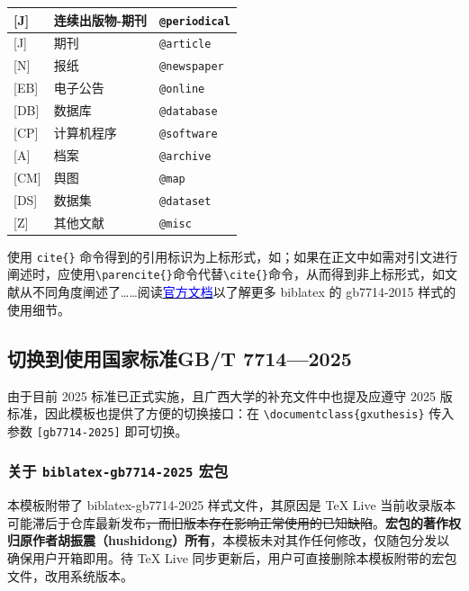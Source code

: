 \begin{table}[htb]
\begin{tabular}{@{}lll@{}}
        \midrule
        {[J]}  & 连续出版物-期刊    & \texttt{@periodical}\cite{periodical_example1,periodical_example2,periodical_example3} \\
        \midrule
        {[J]}  & 期刊               & \texttt{@article}\cite{journal_example1,journal_example2,online_journal_example1} \\
        {[N]}  & 报纸               & \texttt{@newspaper}\cite{news_example1,news_example2,online_news_example1} \\
        \midrule
        {[EB]} & 电子公告           & \texttt{@online} \\
        {[DB]} & 数据库             & \texttt{@database}\cite{dbmt} \\
        {[CP]} & 计算机程序         & \texttt{@software} \\
        {[A]}  & 档案               & \texttt{@archive} \\
        {[CM]} & 舆图               & \texttt{@map} \\
        {[DS]} & 数据集             & \texttt{@dataset} \\
        {[Z]}  & 其他文献           & \texttt{@misc} \\
        \bottomrule
    \end{tabular}
\end{table}

使用 \verb|cite{}| 命令得到的引用标识为上标形式，如\cite{book_example1,book_example2,collection_example1,collection_example2,thesis_example1,thesis_example2}；如果在正文中如需对引文进行阐述时，应使用\verb|\parencite{}|命令代替\verb|\cite{}|命令，从而得到非上标形式，如文献\parencite{book_example1,book_example2,collection_example1,collection_example2,thesis_example1,thesis_example2}从不同角度阐述了……阅读\href{https://mirrors.tuna.tsinghua.edu.cn/CTAN/macros/latex/contrib/biblatex-contrib/biblatex-gb7714-2015/biblatex-gb7714-2015.pdf}{\textcolor{blue}{官方文档}}以了解更多 biblatex 的 gb7714-2015 样式的使用细节。

\subsection{切换到使用国家标准GB/T 7714—2025}

由于目前 2025 标准已正式实施，且广西大学的补充文件中也提及应遵守 2025 版标准，因此模板也提供了方便的切换接口：在 \verb|\documentclass{gxuthesis}| 传入参数 \verb|[gb7714-2025]| 即可切换。

\subsubsection{关于 \texttt{biblatex-gb7714-2025} 宏包}

本模板附带了 biblatex-gb7714-2025 样式文件，其原因是 \TeX{} Live 当前收录版本可能滞后于仓库最新发布\sout{，而旧版本存在影响正常使用的已知缺陷}。\textbf{宏包的著作权归原作者胡振震（hushidong）所有}，本模板未对其作任何修改，仅随包分发以确保用户开箱即用。待 \TeX{} Live 同步更新后，用户可直接删除本模板附带的宏包文件，改用系统版本。